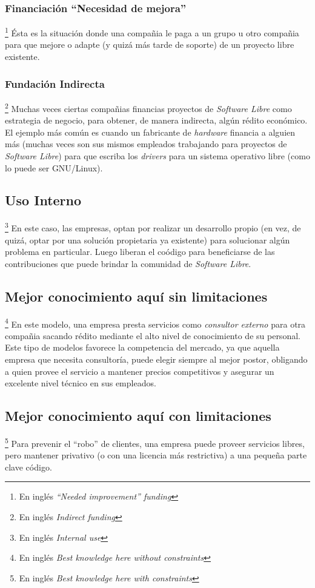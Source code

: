 \subsubsection{Financiaci\'on ``Necesidad de mejora''}\footnote{En ingl\'es
\emph{``Needed improvement'' funding}}
%
\'Esta es la situaci\'on donde una compa\~nia le paga a un grupo u otro
compa\~nia para que mejore o adapte (y quiz\'a m\'as tarde de soporte) de un
proyecto libre existente.

\subsubsection{Fundaci\'on Indirecta}\footnote{En ingl\'es \emph{Indirect
funding}}
%
Muchas veces ciertas compa\~nias financias proyectos de \emph{Software Libre}
como estrategia de negocio, para obtener, de manera indirecta, alg\'un r\'edito
econ\'omico. El ejemplo m\'as com\'un es cuando un fabricante de
\emph{hardware}
financia a alguien m\'as (muchas veces son sus mismos empleados trabajando
para proyectos de \emph{Software Libre}) para que escriba los \emph{drivers}
para un sistema operativo libre (como lo puede ser GNU/Linux). 

\subsection{Uso Interno}\footnote{En ingl\'es \emph{Internal use}}
%
En este caso, las empresas, optan por realizar un desarrollo propio (en vez,
de quiz\'a, optar por una soluci\'on propietaria ya existente) para solucionar
alg\'un problema en particular. Luego liberan el co\'odigo para beneficiarse de
las contribuciones que puede brindar la comunidad de \emph{Software Libre}.

\subsection{Mejor conocimiento aqu\'i sin limitaciones}\footnote{En ingl\'es
\emph{Best knowledge here without constraints}}
%
En este modelo, una empresa presta servicios como \emph{consultor externo} para
otra compa\~nia sacando r\'edito mediante el alto nivel de conocimiento de su
personal.
Este tipo de modelos favorece la competencia del mercado, ya que aquella
empresa que necesita consultor\'ia, puede elegir siempre al mejor postor,
obligando a quien provee el servicio a mantener precios competitivos y
asegurar un excelente nivel t\'ecnico en sus empleados.

\subsection{Mejor conocimiento aqu\'i con limitaciones}\footnote{En
ingl\'es \emph{Best knowledge here with constraints}}
%
Para prevenir el ``robo'' de clientes, una empresa puede proveer servicios
libres, pero mantener privativo (o con una licencia m\'as restrictiva) a una
peque\~na parte clave c\'odigo.

